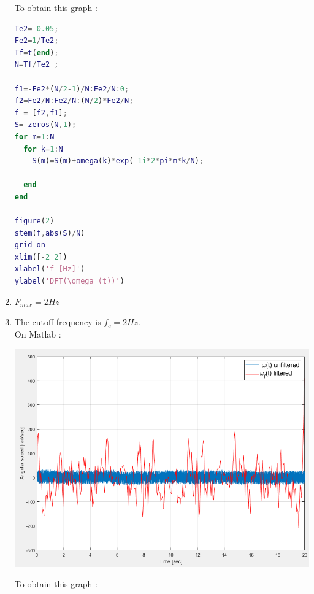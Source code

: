 \documentclass[a4paper,12pt]{article}
\begin{document}
\begin{enumerate}[label={\color{blue}\arabic*)}]
\begin{multicols}{2}
    To obtain this graph :
    
    \begin{lstlisting}[style=Matlab-editor,language=Matlab, basicstyle=\small\ttfamily]
% Plot of the DFT of omega(t)
Te2= 0.05; 
Fe2=1/Te2;
Tf=t(end);
N=Tf/Te2 ;

f1=-Fe2*(N/2-1)/N:Fe2/N:0;
f2=Fe2/N:Fe2/N:(N/2)*Fe2/N;
f = [f2,f1];
S= zeros(N,1);
for m=1:N
  for k=1:N
    S(m)=S(m)+omega(k)*exp(-1i*2*pi*m*k/N);
  
  end
end

figure(2)
stem(f,abs(S)/N)
grid on
xlim([-2 2])
xlabel('f [Hz]')
ylabel('DFT(\omega (t))')
        \end{lstlisting}
        
    \end{multicols}

    \item 
    \(F_{max} = 2 Hz\)
    \newpage

    \item 
    The cutoff frequency is \(f_c = 2 Hz\). \\
    On Matlab :
    \begin{multicols}{2}
    
        \begin{flushleft}
            \includegraphics[scale=0.35]{Images/Omega_Filtered.png}
            \label{Figure3}
        \end{flushleft}
        
    \columnbreak

    To obtain this graph :
    

\end{multicols}
\end{enumerate}
\end{document}
